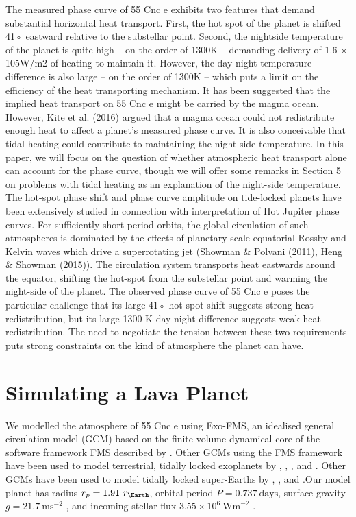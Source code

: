 The measured phase curve of 55 Cnc e exhibits two
features that demand substantial horizontal heat transport. First, the hot spot of the planet is shifted 41◦
eastward relative to the substellar point. Second, the nightside temperature of the planet is quite high – on the
order of 1300K – demanding delivery of 1.6 × 105W/m2
of heating to maintain it. However, the day-night temperature difference is also large – on the order of 1300K
– which puts a limit on the efficiency of the heat transporting mechanism.
It has been suggested that the implied heat transport on 55 Cnc e might be carried by the magma ocean.
However, Kite et al. (2016) argued that a magma ocean
could not redistribute enough heat to affect a planet’s
measured phase curve. It is also conceivable that tidal
heating could contribute to maintaining the night-side
temperature. In this paper, we will focus on the question of whether atmospheric heat transport alone can
account for the phase curve, though we will offer some
remarks in Section 5 on problems with tidal heating as
an explanation of the night-side temperature.
The hot-spot phase shift and phase curve amplitude on tide-locked planets have been extensively studied in connection with interpretation of Hot Jupiter
phase curves. For sufficiently short period orbits,
the global circulation of such atmospheres is dominated by the effects of planetary scale equatorial
Rossby and Kelvin waves which drive a superrotating jet (Showman & Polvani (2011), Heng & Showman
(2015)). The circulation system transports heat eastwards around the equator, shifting the hot-spot from
the substellar point and warming the night-side of the
planet. The observed phase curve of 55 Cnc e poses
the particular challenge that its large 41◦ hot-spot shift
suggests strong heat redistribution, but its large 1300
K day-night difference suggests weak heat redistribution. The need to negotiate the tension between these
two requirements puts strong constraints on the kind of
atmosphere the planet can have.






\section{Simulating a Lava Planet}


We modelled the atmosphere of 55 Cnc e using Exo-FMS, an idealised general circulation model (GCM) based on the finite-volume dynamical core of the software framework FMS described by \citet{lin2004vertically}. Other GCMs using the FMS framework have been used to model terrestrial, tidally locked exoplanets by \citet{merlis2010atmospheric}, \citet{heng2011atmospheric}, \citet{koll2015deciphering}, and \citet{koll2016temperature}. Other GCMs have been used to model tidally locked super-Earths by \citet{carone2014connecting}, \citet{kataria2014atmospheric}, and \citet{charnay20153d}.Our model planet has radius $r_{p} = 1.91\ r_{\Earth}$, orbital period $P = 0.737\ \mathrm{days}$, surface gravity $g = 21.7\ \mathrm{ms}^{-2}$ \citep{demory2016map}, and incoming stellar flux $3.55 \times 10^{6}\ \mathrm{Wm}^{-2}$ \citep{von201155}.

